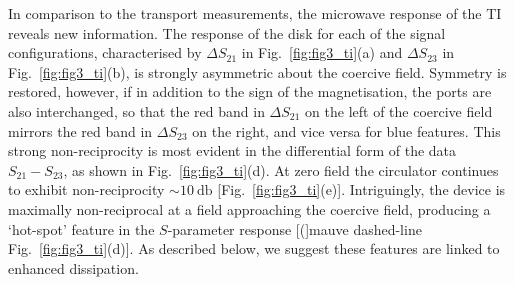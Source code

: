 In comparison to the transport measurements, the microwave response of the TI reveals new information. The response of the disk for each of the signal configurations, characterised by $\Delta S_{21}$ in Fig.~\ref{fig:fig3_ti}(a) and $\Delta S_{23}$ in Fig.~\ref{fig:fig3_ti}(b), is strongly asymmetric about the coercive field. Symmetry is restored, however, if in addition to the sign of the magnetisation, the ports are also interchanged, so that the red band in $\Delta S_{21}$ on the left of the coercive field mirrors the red band in $\Delta S_{23}$ on the right, and vice versa for blue features. This strong non-reciprocity is most evident in the differential form of the data $S_{21} -  S_{23}$, as shown in Fig.~\ref{fig:fig3_ti}(d). At zero field the circulator continues to exhibit non-reciprocity $\sim \SI{10}{\decibel}$ [Fig.~\ref{fig:fig3_ti}(e)]. Intriguingly, the device is maximally non-reciprocal at a field approaching the coercive field, producing a `hot-spot' feature in the $S$-parameter response [(]mauve dashed-line Fig.~\ref{fig:fig3_ti}(d)]. As described below, we suggest these features are linked to enhanced dissipation. 


